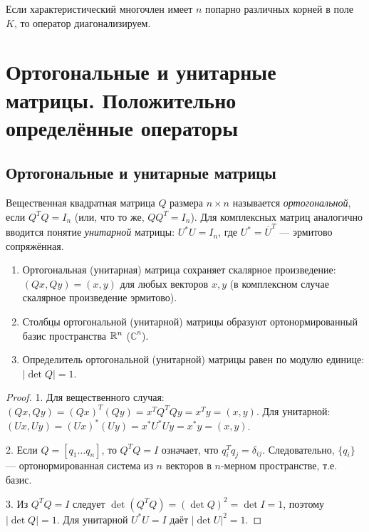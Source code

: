 \documentclass[10pt]{article}
\begin{document}
\begin{corollary}
    Если характеристический многочлен имеет $n$ попарно различных корней в поле $K$, то оператор диагонализируем.
\end{corollary}

\section{Ортогональные и унитарные матрицы. Положительно определённые операторы}

\subsection{Ортогональные и унитарные матрицы}

\begin{definition}
    Вещественная квадратная матрица $Q$ размера $n\times n$ называется \textit{ортогональной}, если $Q^T Q = I_n$ (или, что то же, $Q Q^T = I_n$). Для комплексных матриц аналогично вводится понятие \textit{унитарной} матрицы: $U^* U = I_n$, где $U^* = \overline{U}^T$ — эрмитово сопряжённая.
\end{definition}

\begin{theorem}
    \begin{enumerate}
        \item Ортогональная (унитарная) матрица сохраняет скалярное произведение: $(Qx, Qy) = (x, y)$ для любых векторов $x, y$ (в комплексном случае скалярное произведение эрмитово).
        \item Столбцы ортогональной (унитарной) матрицы образуют ортонормированный базис пространства $\mathbb{R}^n$ ($\mathbb{C}^n$).
        \item Определитель ортогональной (унитарной) матрицы равен по модулю единице: $|\det Q| = 1$.
    \end{enumerate}
\end{theorem}

\begin{proof}
    1. Для вещественного случая: $(Qx, Qy) = (Qx)^T (Qy) = x^T Q^T Q y = x^T y = (x, y)$. Для унитарной: $(Ux, Uy) = (Ux)^* (Uy) = x^* U^* U y = x^* y = (x, y)$.
    
    2. Если $Q = [q_1 \dots q_n]$, то $Q^T Q = I$ означает, что $q_i^T q_j = \delta_{ij}$. Следовательно, $\{q_i\}$ — ортонормированная система из $n$ векторов в $n$-мерном пространстве, т.е. базис.
    
    3. Из $Q^T Q = I$ следует $\det(Q^T Q) = (\det Q)^2 = \det I = 1$, поэтому $|\det Q| = 1$. Для унитарной $U^* U = I$ даёт $|\det U|^2 = 1$.
\end{proof}
\end{document}
